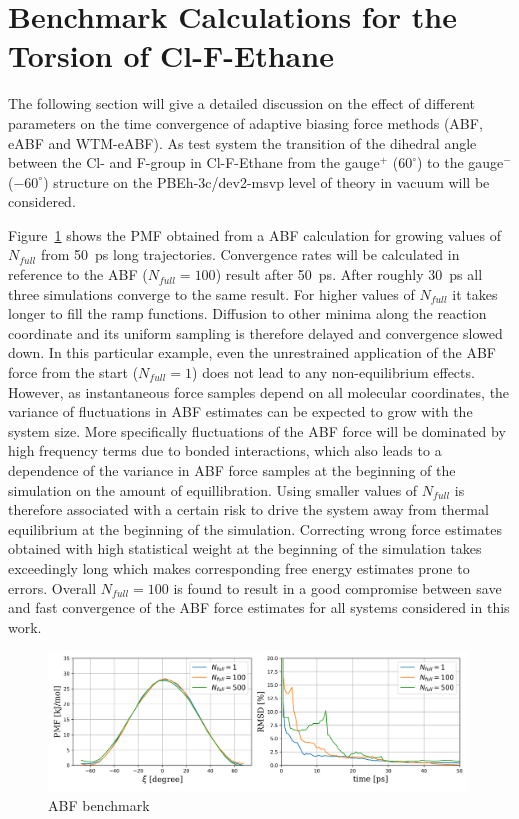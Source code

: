 \newpage
\section{Benchmark Calculations for the Torsion of Cl-F-Ethane}
\label{sec:test}
The following section will give a detailed discussion on the effect of different parameters on the time convergence of adaptive biasing force methods (ABF, eABF and WTM-eABF).
As test system the transition of the dihedral angle between the Cl- and F-group in Cl-F-Ethane from the gauge$^+$ ($60^\circ$) to the gauge$^-$ ($-60^\circ$) structure on the PBEh-3c/dev2-msvp level of theory in vacuum will be considered.

Figure~\ref{fig:ABF benchmark} shows the PMF obtained from a ABF calculation for growing values of $N_{full}$ from 50~ps long trajectories.
Convergence rates will be calculated in reference to the ABF ($N_{full}=100$) result after 50~ps.
After roughly 30~ps all three simulations converge to the same result.
For higher values of $N_{full}$ it takes longer to fill the ramp functions.
Diffusion to other minima along the reaction coordinate and its uniform sampling is therefore delayed and convergence slowed down.
In this particular example, even the unrestrained application of the ABF force from the start ($N_{full}=1$) does not lead to any non-equilibrium effects.
However, as instantaneous force samples depend on all molecular coordinates, the variance of fluctuations in ABF estimates can be expected to grow with the system size.
More specifically fluctuations of the ABF force will be dominated by high frequency terms due to bonded interactions\autocite{lesage2017smoothed}, which also leads to a dependence of the variance in ABF force samples at the beginning of the simulation on the amount of equillibration.\autocite{blondel2004ensemble}
Using smaller values of $N_{full}$ is therefore associated with a certain risk to drive the system away from thermal equilibrium at the beginning of the simulation.
Correcting wrong force estimates obtained with high statistical weight at the beginning of the simulation takes exceedingly long which makes corresponding free energy estimates prone to errors.\autocite{comer2015adaptive}
Overall $N_{full}=100$ is found to result in a good compromise between save and fast convergence of the ABF force estimates for all systems considered in this work.
\begin{figure}[H]
    \centering
    \includegraphics[width=0.99\textwidth]{bilder/benchmark/ABF_benchmark_nfull}
    \caption{ABF benchmark}
    \label{fig:ABF benchmark}
\end{figure}
